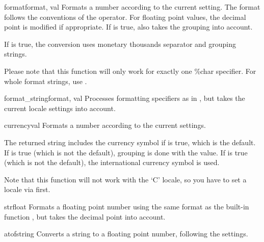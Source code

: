 \begin{funcdesc}{format}{format, val}
  Formats a number  according to the current
   setting.  The format follows the conventions
  of the \code{\%} operator.  For floating point values, the decimal
  point is modified if appropriate.  If  is true, also
  takes the grouping into account.

  If  is true, the conversion uses monetary thousands
  separator and grouping strings.

  Please note that this function will only work for exactly one \%char
  specifier. For whole format strings, use .

\end{funcdesc}

\begin{funcdesc}{format_string}{format, val}
  Processes formatting specifiers as in ,
  but takes the current locale settings into account.

\end{funcdesc}

\begin{funcdesc}{currency}{val}
  Formats a number  according to the current 
  settings. 
  
  The returned string includes the currency symbol if  is true,
  which is the default.
  If  is true (which is not the default), grouping is done with
  the value.
  If  is true (which is not the default), the international
  currency symbol is used.

  Note that this function will not work with the `C' locale, so you have to set
  a locale via  first.

\end{funcdesc}

\begin{funcdesc}{str}{float}
  Formats a floating point number using the same format as the
  built-in function , but takes the decimal
  point into account.
\end{funcdesc}

\begin{funcdesc}{atof}{string}
  Converts a string to a floating point number, following the
   settings.
\end{funcdesc}

